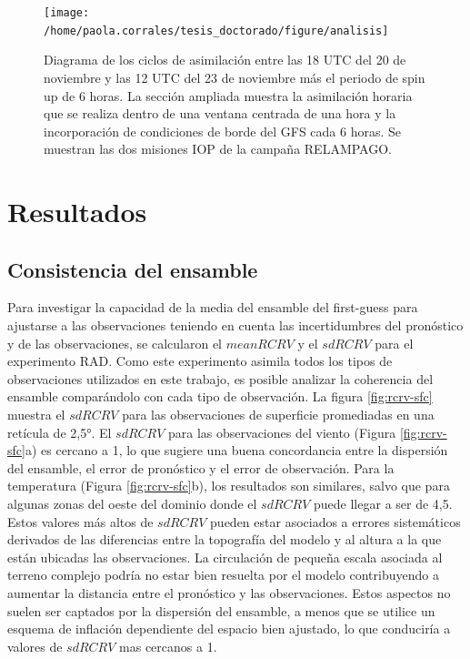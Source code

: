 \documentclass[12pt,oneside,a4paper]{reedthesis}
\begin{document}
\begin{figure}
\texttt{[image: /home/paola.corrales/tesis\_doctorado/figure/analisis]} \caption{Diagrama de los ciclos de asimilación entre las 18 UTC del 20 de noviembre y las 12 UTC del 23 de noviembre más el periodo de spin up de 6 horas. La sección ampliada muestra la asimilación horaria que se realiza dentro de una ventana centrada de una hora y la incorporación de condiciones de borde del GFS cada 6 horas. Se muestran las dos misiones IOP de la campaña RELAMPAGO.}\label{fig:cycle}
\end{figure}
\hypertarget{resultados}{%
\section{Resultados}\label{resultados}}

\hypertarget{consistencia-del-ensamble}{%
\subsection{Consistencia del ensamble}\label{consistencia-del-ensamble}}

Para investigar la capacidad de la media del ensamble del first-guess para ajustarse a las observaciones teniendo en cuenta las incertidumbres del pronóstico y de las observaciones, se calcularon el \(meanRCRV\) y el \(sdRCRV\) para el experimento RAD. Como este experimento asimila todos los tipos de observaciones utilizados en este trabajo, es posible analizar la coherencia del ensamble comparándolo con cada tipo de observación. La figura \ref{fig:rcrv-sfc} muestra el \(sdRCRV\) para las observaciones de superficie promediadas en una retícula de 2,5°. El \(sdRCRV\) para las observaciones del viento (Figura \ref{fig:rcrv-sfc}a) es cercano a 1, lo que sugiere una buena concordancia entre la dispersión del ensamble, el error de pronóstico y el error de observación. Para la temperatura (Figura \ref{fig:rcrv-sfc}b), los resultados son similares, salvo que para algunas zonas del oeste del dominio donde el \(sdRCRV\) puede llegar a ser de 4,5. Estos valores más altos de \(sdRCRV\) pueden estar asociados a errores sistemáticos derivados de las diferencias entre la topografía del modelo y al altura a la que están ubicadas las observaciones. La circulación de pequeña escala asociada al terreno complejo podría no estar bien resuelta por el modelo contribuyendo a aumentar la distancia entre el pronóstico y las observaciones. Estos aspectos no suelen ser captados por la dispersión del ensamble, a menos que se utilice un esquema de inflación dependiente del espacio bien ajustado, lo que conduciría a valores de \(sdRCRV\) mas cercanos a 1.
\end{document}
